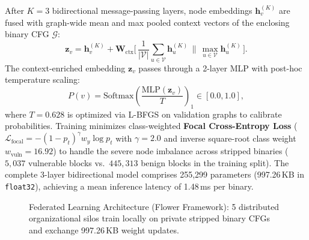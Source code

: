\documentclass[10pt,conference]{IEEEtran}
\begin{document}
After $K=3$ bidirectional message-passing layers, node embeddings $\mathbf{h}_v^{(K)}$ are fused with graph-wide mean and max pooled
context vectors of the enclosing binary CFG $\mathcal{G}$:
\begin{equation}
  \mathbf{z}_v = \mathbf{h}_v^{(K)} + \mathbf{W}_{\text{ctx}}\Big[\, \frac{1}{|\mathcal{V}|}\sum_{u \in \mathcal{V}} \mathbf{h}_u^{(K)} \,\Big\|\, \max_{u \in \mathcal{V}} \mathbf{h}_u^{(K)} \,\Big].
  \label{eq:global_ctx}
\end{equation}
The context-enriched embedding $\mathbf{z}_v$ passes through a 2-layer MLP with post-hoc temperature scaling:
\begin{equation}
  P(v) = \text{Softmax}\!\left( \frac{\text{MLP}(\mathbf{z}_v)}{T} \right)_{\!1} \in [0.0, 1.0],
  \label{eq:prob_calibrated}
\end{equation}
where $T = 0.628$ is optimized via L-BFGS on validation graphs to calibrate probabilities. Training minimizes class-weighted
\textbf{Focal Cross-Entropy Loss} ($\mathcal{L}_{\text{focal}} = -(1 - p_t)^\gamma w_{y} \log p_t$ with $\gamma = 2.0$ and inverse
square-root class weight $w_{\text{vuln}} = 16.92$) to handle the severe node imbalance across stripped binaries ($5{,}037$ vulnerable
blocks vs.\ $445{,}313$ benign blocks in the training split). The complete 3-layer bidirectional model comprises 255{,}299 parameters
(997.26\,KB in \texttt{float32}), achieving a mean inference latency of 1.48\,ms per binary.

\begin{figure}[!t]
\centering
{}
\caption{Federated Learning Architecture (Flower Framework): 5 distributed organizational silos train locally on private stripped binary CFGs and exchange 997.26\,KB weight updates.}
\label{fig:fl_arch}
\end{figure}
\end{document}
